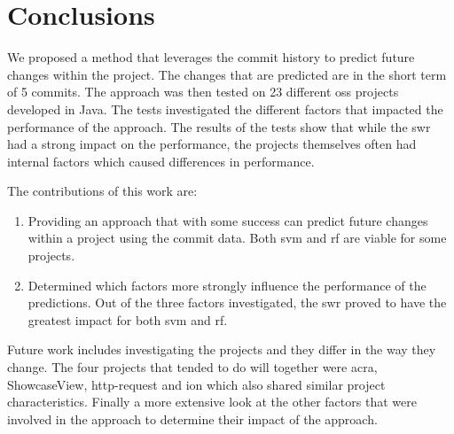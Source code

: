 \chapter{Conclusions}
\label{chap:conclusions}


We proposed a method that leverages the commit history to predict future changes within the project. The changes that are predicted are in the short term of 5 commits. The approach was then tested on 23 different \gls{oss} projects developed in Java. The tests investigated the different factors that impacted the performance of the approach. The results of the tests show that while the \gls{swr} had a strong impact on the performance, the projects themselves often had internal factors which caused differences in performance.

The contributions of this work are:
\begin{enumerate}
\item Providing an approach that with some success can predict future changes within a project using the commit data. Both \gls{svm} and \gls{rf} are viable for some projects.
\item Determined which factors more strongly influence the performance of the predictions. Out of the three factors investigated, the \gls{swr} proved to have the greatest impact for both \gls{svm} and \gls{rf}.
\end{enumerate}

Future work includes investigating the projects and they differ in the way they change. The four projects that tended to do will together were acra, ShowcaseView, http-request and ion which also shared similar project characteristics. Finally a more extensive look at the other factors that were involved in the approach to determine their impact of the approach.



